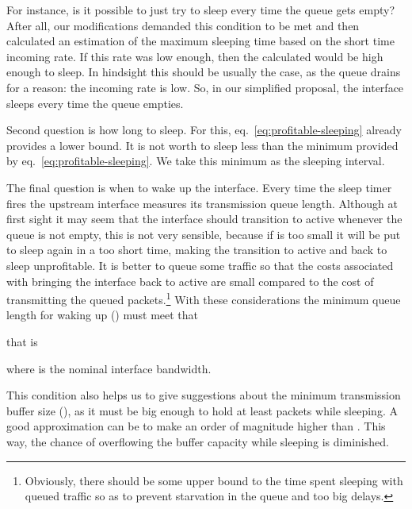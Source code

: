 \documentclass[conference,english]{IEEEtran}
\begin{document}
For instance, is it possible to just try to sleep every time the queue gets
empty? After all, our modifications demanded this condition to be met and then
calculated an estimation of the maximum sleeping time based on the short time
incoming rate. If this rate was low enough, then the calculated 
would be high enough to sleep. In hindsight this should be usually the case,
as the queue drains for a reason: the incoming rate is low. So, in our
simplified proposal, the interface sleeps every time the queue empties.

Second question is how long to sleep. For this,
eq.~\eqref{eq:profitable-sleeping} already provides a lower bound. It is not
worth to sleep less than the minimum provided by
eq.~\eqref{eq:profitable-sleeping}. We take this minimum as the sleeping
interval.

The final question is when to wake up the interface. Every time the sleep
timer fires the upstream interface measures its transmission queue length.
Although at first sight it may seem that the interface should transition to
active whenever the queue is not empty, this is not very sensible, because if
 is too small it will be put to sleep again in a too short time, making the
transition to active and back to sleep unprofitable. It is better to queue
some traffic so that the costs associated with bringing the interface back to
active are small compared to the cost of transmitting the queued
packets.\footnote{Obviously, there should be some upper bound to the time
  spent sleeping with queued traffic so as to prevent starvation in the queue
  and too big delays.} With these considerations the minimum queue length for
waking up () must meet that

that is

where  is the nominal interface bandwidth.

This condition also helps us to give suggestions about the minimum
transmission buffer size (), as it must be big enough to hold at least
 packets while sleeping. A good approximation can be to make
 an order of magnitude higher than . This way, the chance
of overflowing the buffer capacity while sleeping is diminished.
\end{document}
